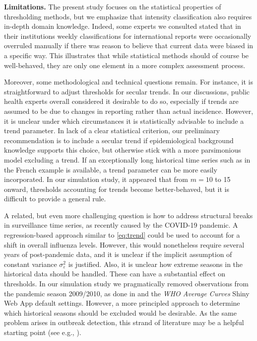 \documentclass[12pt]{article}
\begin{document}
\noindent \textbf{Limitations.} The present study focuses on the statistical properties of thresholding methods, but we emphasize that intensity classification also requires in-depth domain knowledge. Indeed, some experts we consulted stated that in their institutions weekly classifications for international reports were occasionally overruled manually if there was reason to believe that current data were biased in a specific way. This illustrates that while statistical methods should of course be well-behaved, they are only one element in a more complex assessment process.

Moreover, some methodological and technical questions remain. For instance, it is straightforward to adjust thresholds for secular trends. In our discussions, public health experts overall considered it desirable to do so, especially if trends are assumed to be due to changes in reporting rather than actual incidence. However, it is unclear under which circumstances it is statistically advisable to include a trend parameter. In lack of a clear statistical criterion, our preliminary recommendation is to include a secular trend if epidemiological background knowledge supports this choice, but otherwise stick with a more parsimonious model excluding a trend. If an exceptionally long historical time series such as in the French example is available, a trend parameter can be more easily incorporated. In our simulation study, it appeared that from $m = 10$ to 15 onward, thresholds accounting for trends become better-behaved, but it is difficult to provide a general rule.

A related, but even more challenging question is how to address structural breaks in surveillance time series, as recently caused by the COVID-19 pandemic. A regression-based approach similar to \eqref{eq:trend} could be used to account for a shift in overall influenza levels. However, this would nonetheless require several years of post-pandemic data, and it is unclear if the implicit assumption of constant variance $\sigma^2_\varepsilon$ is justified. Also, it is unclear how extreme seasons in the historical data should be handled. These can have a substantial effect on thresholds. In our simulation study we pragmatically removed observations from the pandemic season 2009/2010, as done in \cite{Vega2015} and the \textit{WHO Average Curves} Shiny Web App default settings. However, a more principled approach to determine which historical seasons should be excluded would be desirable. As the same problem arises in outbreak detection, this strand of literature may be a helpful starting point (see e.g., \citealt{Noufaily2013}).
\end{document}
